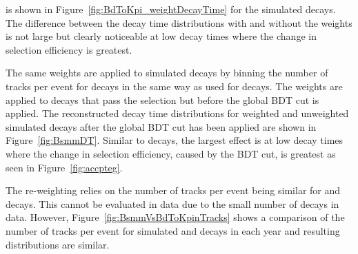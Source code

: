 \noindent is shown in Figure~\ref{fig:BdToKpi_weightDecayTime} for the simulated \bdkpi decays. The difference between the decay time distributions with and without the weights is not large but clearly noticeable at low decay times where the change in selection efficiency is greatest.       


The same weights are applied to simulated \bsmumu decays by binning the number of tracks per event for \bsmumu decays in the same way as used for \bdkpi decays. The weights are applied to decays that pass the selection but before the global BDT cut is applied. The reconstructed decay time distributions for weighted and unweighted \bsmumu simulated decays after the global BDT cut has been applied are shown in Figure~\ref{fig:BsmmDT}. %
Similar to \bdkpi decays, the largest effect is at low decay times where the change in selection efficiency, caused by the BDT cut, is greatest as seen in Figure~\ref{fig:accpteg}.

The re-weighting relies on the number of tracks per event being similar for \bdkpi and \bsmumu decays. This cannot be evaluated in data due to the small number of \bsmumu decays in data. However, Figure~\ref{fig:BsmmVsBdToKpinTracks} shows a comparison of the number of tracks per event for simulated \bsmumu and \bdkpi decays in each year and resulting distributions are similar.


